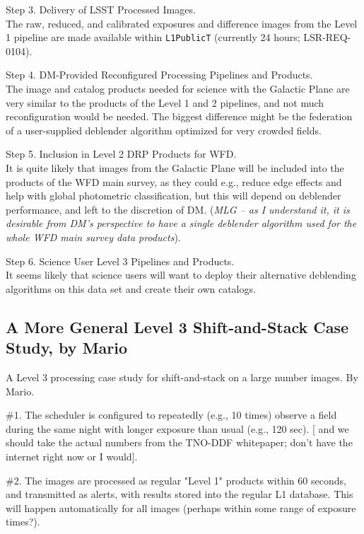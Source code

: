 \documentclass[DM,lsstdraft,toc]{lsstdoc}
\begin{document}
Step 3. Delivery of LSST Processed Images. \\
The raw, reduced, and calibrated exposures and difference images from the Level 1 pipeline are made available within  {\tt L1PublicT} (currently 24 hours; LSR-REQ-0104).

Step 4. DM-Provided Reconfigured Processing Pipelines and Products. \\
The image and catalog products needed for science with the Galactic Plane are very similar to the products of the Level 1 and 2 pipelines, and not much reconfiguration would be needed. The biggest difference might be the federation of a user-supplied deblender algorithm optimized for very crowded fields. 

Step 5. Inclusion in Level 2 DRP Products for WFD. \\
It is quite likely that images from the Galactic Plane will be included into the products of the WFD main survey, as they could e.g., reduce edge effects and help with global photometric classification, but this will depend on deblender performance, and left to the discretion of DM. ({\it MLG -- as I understand it, it is desirable from DM's perspective to have a single deblender algorithm used for the whole WFD main survey data products}).

Step 6. Science User Level 3 Pipelines and Products. \\
It seems likely that science users will want to deploy their alternative deblending algorithms on this data set and create their own catalogs. 


\subsection{A More General Level 3 Shift-and-Stack Case Study, by Mario}\label{ssec:SPCS_SAS}

A Level 3 processing case study for shift-and-stack on a large number images. By Mario.

\#1. The scheduler is configured to repeatedly (e.g., 10 times) observe a field during the same night with longer exposure than usual (e.g., 120 sec). [ and we should take the actual numbers from the TNO-DDF whitepaper; don't have the internet right now or I would].

\#2. The images are processed as regular "Level 1" products within 60 seconds, and transmitted as alerts, with results stored into the regular L1 database. This will happen automatically for all images (perhaps within some range of exposure times?).
\end{document}
